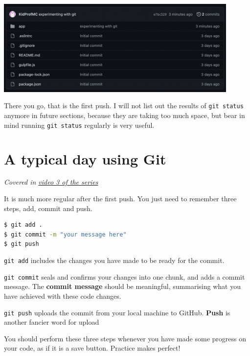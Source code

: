 \begin{center}
\includegraphics[width=12cm]{images/ch3-firstpushsuccess.png}
\end{center}

There you go, that is the first push. I will not list out the results of \texttt{git status} anymore in future sections, because they are taking too much space, but bear in mind running \texttt{git status} regularly is very useful.

\section{A typical day using Git}
\label{sec:gcmsg}

\textit{Covered in \href{https://www.youtube.com/watch?v=wQmFz-Ggxuo&list=PLjGmdnqrOKuYXiu7lgG5HW71jPEUd1XCm&index=4}{video 3 of the series}}
\vspace{6mm}

It is much more regular after the first push. You just need to remember three steps, add, commit and push.

\begin{lstlisting}[language=bash]
$ git add .
$ git commit -m "your message here"
$ git push
\end{lstlisting}

\texttt{git add} includes the changes you have made to be ready for the commit. 

\texttt{git commit} seals and confirms your changes into one chunk, and adds a commit message. The \textbf{commit message} should be meaningful, summarising what you have achieved with these code changes.

\texttt{git push} uploads the commit from your local machine to GitHub. \textbf{Push} is another fancier word for upload
\vspace{6mm}

You should perform these three steps whenever you have made some progress on your code, as if it is a save button. Practice makes perfect!

